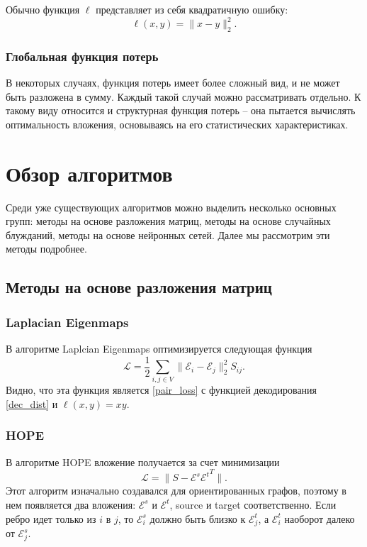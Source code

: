 \documentclass[12pt,a4paper]{extarticle}
\newcommand{\E}{\mathcal{E}}
\newcommand{\Loss}{\mathcal{L}}
\begin{document}
    Обычно функция $\ell$ представляет из себя квадратичную ошибку:
    \begin{equation} \label{pair_loss_dist}
    \ell(x, y) = \lVert x - y \rVert_2^2.
    \end{equation}
    
    \subsubsection{Глобальная функция потерь}
    В некоторых случаях, функция потерь имеет более сложный вид, и не может быть разложена в сумму. Каждый такой случай можно рассматривать отдельно. К такому виду относится и структурная функция потерь -- она пытается вычислять оптимальность вложения, основываясь на его статистических характеристиках.

    \section{Обзор алгоритмов}
    Среди уже существующих алгоритмов можно выделить несколько основных групп: методы на основе разложения матриц, методы на основе случайных блужданий, методы на основе нейронных сетей. Далее мы рассмотрим эти методы подробнее.
    \subsection{Методы на основе разложения матриц}
    \subsubsection{Laplacian Eigenmaps \cite{laplacianeigenmaps}}
    В алгоритме Laplcian Eigenmaps оптимизируется следующая функция
    \begin{equation} \label{lapl_loss}
        \Loss = \frac{1}{2} \sum_{i, j \in V} \lVert \E_i - \E_j \rVert_2 ^ 2 S_{ij}.
    \end{equation}
    Видно, что эта функция является \eqref{pair_loss} с функцией декодирования \eqref{dec_dist} и $\ell(x, y) = xy$.
    
    
    \subsubsection{HOPE \cite{HOPE}}
    
    В алгоритме HOPE вложение получается за счет минимизации
    \[
    \Loss = \lVert S - \E^s {\E^t}^T \rVert.
    \]
    Этот алгоритм изначально создавался для ориентированных графов, поэтому в нем появляется два вложения: $\E^s$ и $\E^t$, source и target соответственно. Если ребро идет только из $i$ в $j$, то $\E^s_i$ должно быть близко к $\E^t_j$, а $\E^t_i$ наоборот далеко от $\E^s_j$.
    
\end{document}

